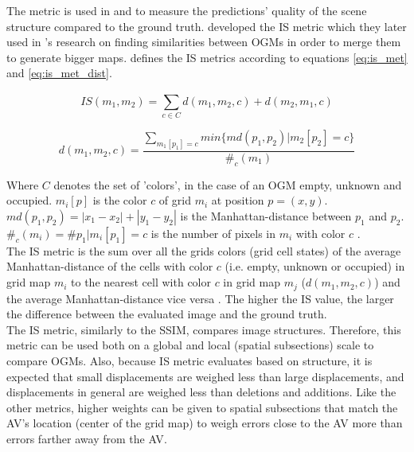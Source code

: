 \subsubsection{}
The  metric is used in \cite{lange2020attention} and \cite{toyungyernsub2020double} to measure the predictions' quality of the scene structure compared to the ground truth. \cite{birk1996learning} developed the \gls{IS} metric which they later used in \cite{birk2006merging}'s research on finding similarities between \glspl{OGM} in order to merge them to generate bigger maps. \cite{birk1996learning} defines the \gls{IS} metrics according to  equations \ref{eq:is_met} and \ref{eq:is_met_dist}.


\begin{equation} \label{eq:is_met}
	IS(m_1, m_2) = \sum_{c \in C}^{}d(m_1, m_2,c) + d(m_2,m_1,c)
\end{equation}

\begin{equation} \label{eq:is_met_dist}
	d(m_1, m_2,c) = \frac{\sum_{m_1[p_1]=c}^{} min\{md(p_1, p_2)|m_2[p_2]=c\}}{\#_c(m_1)}
\end{equation}

Where $C$ denotes the set of 'colors', in the case of an \gls{OGM} empty, unknown and occupied. $m_i[p]$ is the color $c$ of grid $m_i$ at position $p=(x,y)$. $md(p_1,p_2) = |x_1 - x_2| + |y_1 - y_2|$ is the Manhattan-distance between $p_1$ and $p_2$. $\#_c(m_i) = \#{p_1|m_i[p_1] = c}$ is the number of pixels in $m_i$ with color $c$ \cite{birk1996learning}. \\
The \gls{IS} metric is the sum over all the grids colors (grid cell states) of the average Manhattan-distance of the cells with color $c$ (i.e. empty, unknown or occupied) in grid map $m_i$ to the nearest cell with color $c$ in grid map $m_j$ ($d(m_1, m_2,c)$) and the average Manhattan-distance vice versa \cite{birk1996learning}. The higher the \gls{IS} value, the larger the difference between the evaluated image and the ground truth. \\

The \gls{IS} metric, similarly to the \gls{SSIM}, compares image structures. Therefore, this metric can be used both on a global and local (spatial subsections) scale to compare \glspl{OGM}. Also, because \gls{IS} metric evaluates based on structure, it is expected that small displacements are weighed less than large displacements, and displacements in general are weighed less than deletions and additions. Like the other metrics, higher weights can be given to spatial subsections that match the \gls{AV}'s location (center of the grid map) to weigh errors close to the \gls{AV} more than errors farther away from the \gls{AV}.

